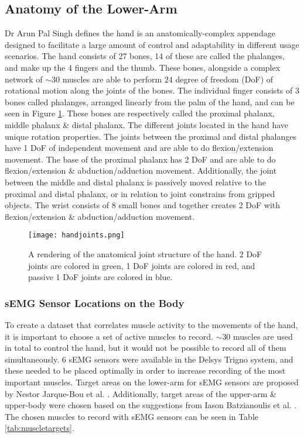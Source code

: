 \documentclass[../main.tex]{subfiles}
\begin{document}
\subsection{Anatomy of the Lower-Arm}
\label{sec:anatomy}

Dr Arun Pal Singh \cite{anatomy} defines the hand is an anatomically-complex appendage designed to facilitate a large amount of control and adaptability in different usage scenarios.
The hand consists of 27 bones, 14 of these are called the \gls{phalanges}, and make up the 4 fingers and the thumb.
These bones, alongside a complex network of $\sim30$ muscles are able to perform $24$ degree of freedom (DoF) of rotational motion along the joints of the bones.
The individual finger consists of 3 bones called \gls{phalanges}, arranged linearly from the palm of the hand, and can be seen in Figure \ref{fig:anatomy}.
These bones are respectively called the \gls{proximal phalanx}, \gls{middle phalanx} \& \gls{distal phalanx}.
The different joints located in the hand have unique rotation properties.
The joints between the proximal and distal phalanges have 1 DoF of independent movement and are able to do \gls{flexion/extension} movement.
The base of the proximal phalanx has 2 DoF and are able to do \gls{flexion/extension} \& \gls{abduction/adduction} movement.
Additionally, the joint between the middle and distal phalanx is passively moved relative to the proximal and distal phalanx, or in relation to joint constrains from gripped objects.
The wrist consists of 8 small bones and together creates 2 DoF with \gls{flexion/extension} \& \gls{abduction/adduction} movement.

\begin{figure}[H]
\begin{center}
\texttt{[image: handjoints.png]}
\caption{A rendering of the anatomical joint structure of the hand. 2 DoF joints are colored in green, 1 DoF joints are colored in red, and passive 1 DoF joints are colored in blue.}
\label{fig:anatomy}
\end{center}
\end{figure}

\subsubsection{sEMG Sensor Locations on the Body}
\label{sec:muscleplacements}

To create a dataset that correlates muscle activity to the movements of the hand, it is important to choose a set of active muscles to record.
$\sim 30$ muscles are used in total to control the hand, but it would not be possible to record all of them simultaneously.
6 sEMG sensors were available in the Delsys Trigno \cite{trigno} system, and these needed to be placed optimally in order to increase recording of the most important muscles.
Target areas on the lower-arm for sEMG sensors are proposed by Nestor Jarque-Bou et al. \cite{jarque2019}.
Additionally, target areas of the upper-arm \& upper-body were chosen based on the suggestions from Iason Batzianoulis et al. \cite{Batzianoulis2018}.
The chosen muscles to record with sEMG sensors can be seen in Table \ref{tab:muscletargets}.
\end{document}
